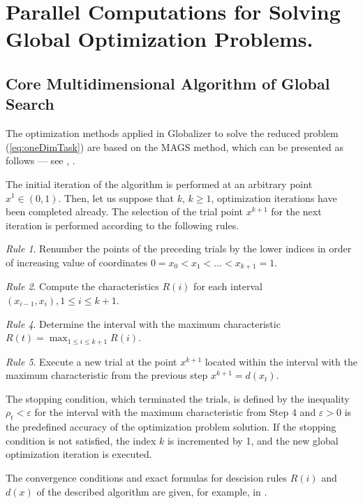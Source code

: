 \documentclass[runningheads]{llncs}
\begin{document}
\section{Parallel Computations for Solving Global Optimization Problems.}
\subsection{Core Multidimensional Algorithm of Global Search}

The optimization methods applied in Globalizer to solve the reduced problem
(\ref{eq:oneDimTask}) are based on the MAGS method, which can be presented as follows ---
see \cite{strongin1978}, \cite{strSergGO}.
\par
The initial iteration of the algorithm is performed at an arbitrary point \mbox{\(x^1\in(0,1)\)}.
Then, let us suppose that \(k\), \(k\ge 1\), optimization iterations have been completed already.
The selection of the trial point \(x^{k+1}\) for the next iteration is performed according to the
following rules.

\textit{Rule 1}. Renumber the points of the preceding trials by the lower indices in order of
increasing value of coordinates
$0=x_0<x_1<...<x_{k+1}=1$.

\textit{Rule 2}. Compute the characteristics \(R(i)\) for each interval \((x_{i-1},x_i),1\leq i\leq
k+1\).

\textit{Rule 4}. Determine the interval with the maximum characteristic $R(t)=\max_{1\leq i
\leq k+1}R(i)$.

\textit{Rule 5}. Execute a new trial at the point \(x^{k+1}\) located within the interval with the
maximum characteristic from the previous step
  $x^{k+1}=d(x_t)$.

The stopping condition, which terminated the trials, is defined by the inequality
$\rho_t<\varepsilon$
for the interval with the maximum characteristic from Step 4 and \(\varepsilon >0\) is the
predefined
accuracy of the optimization problem solution. If the stopping condition is not satisfied,
the index \(k\) is incremented by 1, and the new global optimization iteration is executed.

The convergence conditions and exact formulas for descision rules $R(i)$ and $d(x)$ of the
described algorithm are given, for example, in \cite{strSergGO}.

\end{document}
